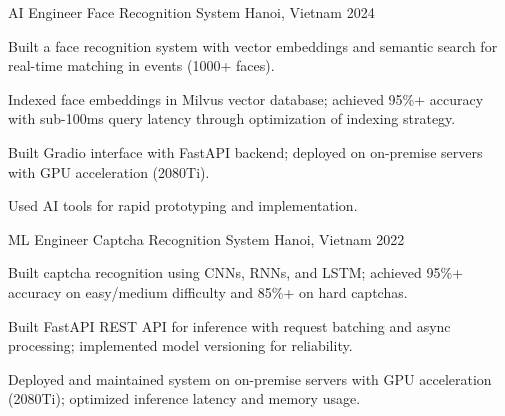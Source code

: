 \begin{cventries}
\cventry
  {AI Engineer} %
  {Face Recognition System} %
  {Hanoi, Vietnam} %
  {2024} %
  {
    \begin{cvitems}
      \item {Built a face recognition system with vector embeddings and semantic search for real-time matching in events (1000+ faces).}
      \item {Indexed face embeddings in Milvus vector database; achieved 95\%+ accuracy with sub-100ms query latency through optimization of indexing strategy.}
      \item {Built Gradio interface with FastAPI backend; deployed on on-premise servers with GPU acceleration (2080Ti).}
      \item {Used AI tools for rapid prototyping and implementation.}
    \end{cvitems}
  }

\cventry
  {ML Engineer} %
  {Captcha Recognition System} %
  {Hanoi, Vietnam} %
  {2022} %
  {
    \begin{cvitems}
      \item {Built captcha recognition using CNNs, RNNs, and LSTM; achieved 95\%+ accuracy on easy/medium difficulty and 85\%+ on hard captchas.}
      \item {Built FastAPI REST API for inference with request batching and async processing; implemented model versioning for reliability.}
      \item {Deployed and maintained system on on-premise servers with GPU acceleration (2080Ti); optimized inference latency and memory usage.}
    \end{cvitems}
  }


\end{cventries}
